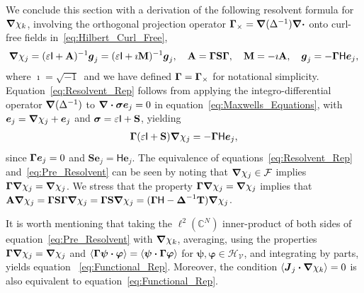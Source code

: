 \documentclass[leqno,onefignum,onetabnum]{siamltex1213}
\newcommand{\Mb}{\mathbf{M}}
\newcommand{\Tb}{\mathbf{T}}
\newcommand{\Sb}{\mathbf{S}}
\newcommand{\Ab}{\mathbf{A}}
\newcommand{\Vc}{\mathcal{V}}
\newcommand{\Hc}{\mathcal{H}}
\newcommand{\Fc}{\mathcal{F}}
\newcommand{\Hm}{\mathsf{H}}
\newcommand{\Ib}{\mathsf{I}}
\newcommand\bsig{\mbox{\boldmath${\sigma}$}}
\newcommand\bDelta{\mbox{\boldmath${\Delta}$}}
\newcommand\bGamma{\mbox{\boldmath${\Gamma}$}}
\newcommand\bnabla{\mbox{\boldmath${\nabla}$}}
\providecommand\bcdot{\boldsymbol{\cdot}}
\newcommand{\vecJ}{\boldsymbol{J}}
\newcommand{\vecg}{\boldsymbol{g}}
\newcommand{\vece}{\boldsymbol{e}}
\newcommand{\vecpsi}{\boldsymbol{\psi}}
\newcommand{\vecvarphi}{\boldsymbol{\varphi}}
\begin{document}
We conclude this section with a derivation of the following resolvent
formula for $\bnabla \chi_k$, involving the orthogonal projection
operator $\bGamma_\times=\bnabla (\Delta^{-1})\bnabla \bcdot$ onto curl-free
fields in~\eqref{eq:Hilbert_Curl_Free},   
\begin{align}\label{eq:Resolvent_Rep}
  \bnabla \chi_j=(\varepsilon\Ib+\Ab)^{-1}\vecg_j
           =(\varepsilon\Ib+\imath\Mb)^{-1}\vecg_j, \quad
  \Ab=\bGamma\Sb\bGamma, \quad
  \Mb=-\imath\Ab, \quad
  \vecg_j=-\bGamma\Hm\vece _j,
\end{align}
%
where $\imath=\sqrt{-1}\,$ and we have defined $\bGamma=\bGamma_\times$ for
notational simplicity. Equation~\eqref{eq:Resolvent_Rep} follows from
applying the integro-differential operator $\bnabla (\Delta^{-1})$ to
$\bnabla \bcdot\bsig\vece _j=0$ in equation~\eqref{eq:Maxwells_Equations},
with $\vece _j=\bnabla \chi_j+\vece _j$ and $\bsig=\varepsilon\Ib+\Sb$, yielding  
%
\begin{align}\label{eq:Pre_Resolvent}
  \bGamma(\varepsilon\Ib+\Sb)\bnabla \chi_j=-\bGamma\Hm\vece _j,
\end{align}
%
since $\bGamma\vece _j=0$ and $\Sb\vece _j=\Hm\vece _j$.
The equivalence of equations~\eqref{eq:Resolvent_Rep}
and~\eqref{eq:Pre_Resolvent} can be seen by noting that 
$\bnabla \chi_j\in\Fc$ implies $\bGamma\bnabla \chi_j=\bnabla \chi_j$. We stress
that the property $\bGamma\bnabla \chi_j=\bnabla \chi_j$ implies that
$\Ab\bnabla \chi_j=\bGamma\Sb\bGamma\bnabla \chi_j=\bGamma\Sb\bnabla \chi_j
=(\bGamma\Hm-\bDelta^{-1}\Tb)\bnabla \chi_j$. 



It is worth mentioning that taking the  $\ell^2(\mathbb{C}^N)$
inner-product of both sides of equation~\eqref{eq:Pre_Resolvent} with
$\bnabla \chi_k$, averaging, using the properties
$\bGamma\bnabla \chi_j=\bnabla \chi_j$ and
$\langle\bGamma\vecpsi\bcdot\vecvarphi\rangle=\langle\vecpsi\bcdot\bGamma\vecvarphi\rangle$ for 
$\vecpsi,\vecvarphi\in\Hc_{\Vc}$, and integrating by parts, yields
equation ~\eqref{eq:Functional_Rep}. Moreover, the condition
$\langle\vecJ_j\bcdot\bnabla \chi_k\rangle=0$ is also equivalent to
equation~\eqref{eq:Functional_Rep}.    
\end{document}
